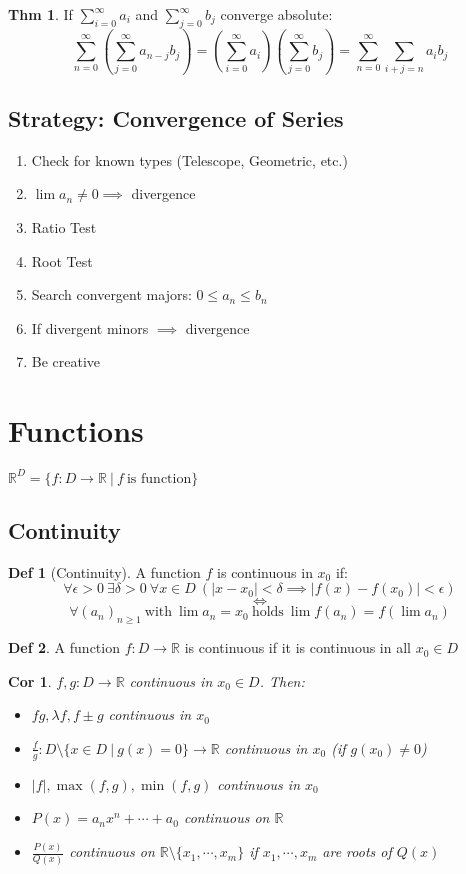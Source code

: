 \documentclass[a4paper, 10pt]{article}
\newtheorem*{corollary}{Cor}
\theoremstyle{definition}
\newtheorem*{theorem}{Thm}
\newtheorem*{definition}{Def}
\theoremstyle{named}
\newcommand{\R}{\mathbb{R}}
\begin{document}
\begin{theorem}
    If $\sum_{i=0}^\infty a_i$ and $\sum_{j=0}^\infty b_j$ converge absolute:
    $$\sum_{n=0}^\infty (\sum_{j=0}^\infty a_{n-j}b_j) = (\sum_{i=0}^\infty a_i) (\sum_{j=0}^\infty b_j) = \sum_{n=0}^\infty \sum_{i+j = n} a_i b_j$$
\end{theorem}

\subsection{Strategy: Convergence of Series}
\begin{enumerate}
    \item Check for known types (Telescope, Geometric, etc.)
    \item $\lim a_n \neq 0 \implies$ divergence
    \item Ratio Test
    \item Root Test
    \item Search convergent majors: $0 \leq a_n \leq b_n$
    \item If divergent minors $\implies$ divergence
    \item Be creative
\end{enumerate}

\section{Functions}
$\R^D = \{f: D \to \R \ | \ f \ \text{is function} \}$
\subsection{Continuity}
\begin{definition}[Continuity]
    A function $f$ is continuous in $x_0$ if:
    $$\forall \epsilon > 0 \ \exists \delta > 0 \ \forall x \in D \ (|x - x_0| < \delta \implies |f(x) - f(x_0)| < \epsilon)$$
    $$\iff$$
    $$\forall (a_n)_{n \geq 1} \ \text{with} \ \lim a_n = x_0 \ \text{holds} \ \lim f(a_n) = f(\lim a_n)$$
\end{definition}

\begin{definition}
    A function $f: D \to \R$ is continuous if it is continuous in all $x_0 \in D$
\end{definition}

\begin{corollary}
    $f, g: D \to \R$ continuous in $x_0 \in D$. Then:
    \begin{itemize}
        \item $fg, \lambda f, f \pm g$ continuous in $x_0$
        \item $\frac{f}{g}: D \setminus \{x \in D \ | \ g(x) = 0\} \to \R$ continuous in $x_0$ (if $g(x_0) \neq 0$)
        \item $|f|, \max(f, g), \min(f, g)$ continuous in $x_0$
        \item $P(x) = a_n x^n + \cdots + a_0$ continuous on $\R$
        \item $\frac{P(x)}{Q(x)}$ continuous on $\R \setminus \{x_1, \cdots, x_m\}$ if $x_1, \cdots, x_m$ are roots of $Q(x)$
    \end{itemize}
\end{corollary}
\end{document}
